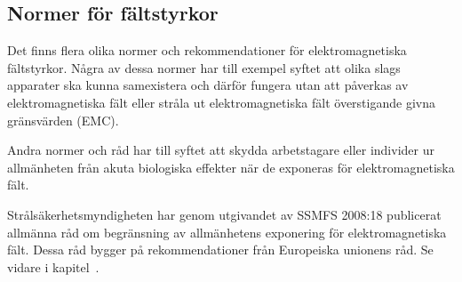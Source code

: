 \subsection{Normer för fältstyrkor}

Det finns flera olika normer och rekommendationer för elektromagnetiska
fältstyrkor.
Några av dessa normer har till exempel syftet att olika slags apparater ska
kunna samexistera och därför fungera utan att påverkas av elektromagnetiska fält
eller stråla ut elektromagnetiska fält överstigande givna gränsvärden (EMC).

Andra normer och råd har till syftet att skydda arbetstagare eller individer
ur allmänheten från akuta biologiska effekter när de exponeras för
elektromagnetiska fält.

Strålsäkerhetsmyndigheten har genom utgivandet av SSMFS 2008:18 publicerat
allmänna råd om begränsning av allmänhetens exponering för elektromagnetiska
fält.
Dessa råd bygger på rekommendationer från Europeiska unionens råd.
Se vidare i kapitel~.
